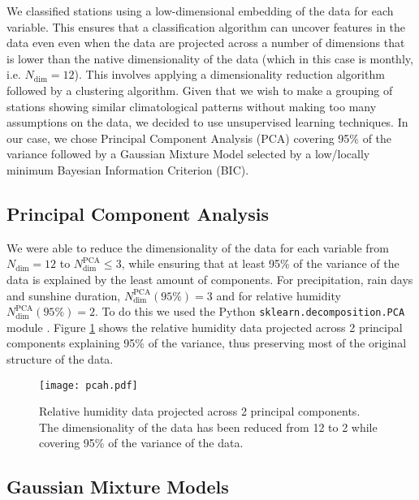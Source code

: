 \documentclass[12pt]{iopart}
\begin{document}
We classified stations using a low-dimensional embedding of the data \cite{embed} for each variable. This ensures that a classification algorithm can uncover features in the data even even when the data are projected across a number of dimensions that is lower than the native dimensionality of the data (which in this case is monthly, i.e. $N_\mathrm{dim}=12$). This involves applying a dimensionality reduction algorithm followed by a clustering algorithm. Given that we wish to make a grouping of stations showing similar climatological patterns without making too many assumptions on the data, we decided to use unsupervised learning techniques.  In our case, we chose Principal Component Analysis (PCA) covering 95\% of the variance followed by a Gaussian Mixture Model selected by a low/locally minimum Bayesian Information Criterion (BIC). 

\subsection{Principal Component Analysis}

We were able to reduce the dimensionality of the data for each variable from  $N_\mathrm{dim}=12$ to  $N_\mathrm{dim}^\mathrm{PCA}\le3$, while ensuring that at least 95\% of the variance of the data is explained by the least amount of components. For precipitation, rain days and sunshine duration, $N_\mathrm{dim}^\mathrm{PCA}(95\%)=3$ and for relative humidity $N_\mathrm{dim}^\mathrm{PCA}(95\%)=2$. To do this we used the Python \texttt{sklearn.decomposition.PCA} module \cite{sklearn}. Figure \ref{pcah} shows the relative humidity data projected across 2 principal components explaining 95\% of the variance, thus preserving most of the original structure of the data.

\begin{figure}
\begin{center}
\texttt{[image: pcah.pdf]}
\caption{Relative humidity data projected across 2 principal components. The dimensionality of the data has been reduced from 12 to 2 while covering 95\% of the variance of the data. }\label{pcah}
\end{center}
\end{figure}

\subsection{Gaussian Mixture Models}
\end{document}
